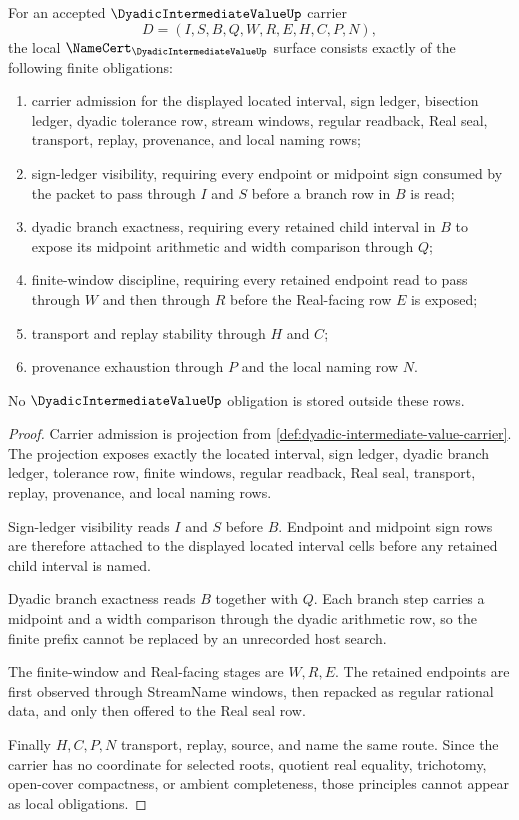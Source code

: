 \begin{theorem}
\label{thm:dyadic-intermediate-value-namecert-obligations}
For an accepted $\DyadicIntermediateValueUp$ carrier
$$
D=(I,S,B,Q,W,R,E,H,C,P,N),
$$
the local $\NameCert_{\DyadicIntermediateValueUp}$ surface consists exactly of the following finite obligations:
\begin{enumerate}
\item carrier admission for the displayed located interval, sign ledger, bisection ledger, dyadic tolerance row, stream windows, regular readback, Real seal, transport, replay, provenance, and local naming rows;
\item sign-ledger visibility, requiring every endpoint or midpoint sign consumed by the packet to pass through $I$ and $S$ before a branch row in $B$ is read;
\item dyadic branch exactness, requiring every retained child interval in $B$ to expose its midpoint arithmetic and width comparison through $Q$;
\item finite-window discipline, requiring every retained endpoint read to pass through $W$ and then through $R$ before the Real-facing row $E$ is exposed;
\item transport and replay stability through $H$ and $C$;
\item provenance exhaustion through $P$ and the local naming row $N$.
\end{enumerate}
No $\DyadicIntermediateValueUp$ obligation is stored outside these rows.
\end{theorem}
\begin{proof}
Carrier admission is projection from \autoref{def:dyadic-intermediate-value-carrier}. The projection exposes exactly the located interval, sign ledger, dyadic branch ledger, tolerance row, finite windows, regular readback, Real seal, transport, replay, provenance, and local naming rows.

Sign-ledger visibility reads $I$ and $S$ before $B$. Endpoint and midpoint sign rows are therefore attached to the displayed located interval cells before any retained child interval is named.

Dyadic branch exactness reads $B$ together with $Q$. Each branch step carries a midpoint and a width comparison through the dyadic arithmetic row, so the finite prefix cannot be replaced by an unrecorded host search.

The finite-window and Real-facing stages are $W,R,E$. The retained endpoints are first observed through StreamName windows, then repacked as regular rational data, and only then offered to the Real seal row.

Finally $H,C,P,N$ transport, replay, source, and name the same route. Since the carrier has no coordinate for selected roots, quotient real equality, trichotomy, open-cover compactness, or ambient completeness, those principles cannot appear as local obligations.
\end{proof}

